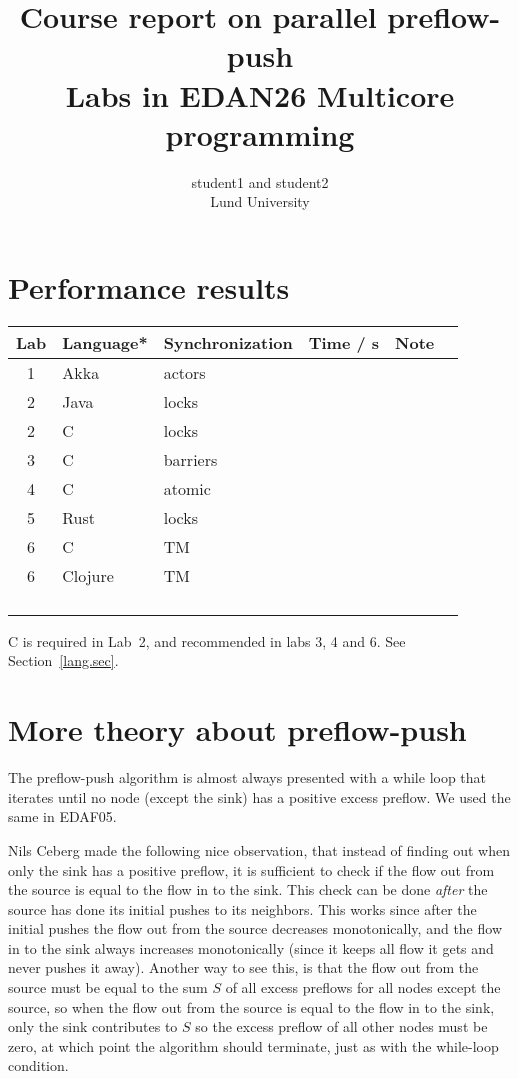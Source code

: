 \documentclass{forsete}
\author{student1 and student2\\Lund University}
\title{Course report on parallel preflow-push\\{\normalsize Labs in EDAN26 Multicore programming}}
\begin{document}
\maketitle

\section{Performance results}
\begin{center}
\begin{tabular}{|c|l|l|r|l|}
\hline
Lab & Language* & Synchronization & Time / s & Note \hspace{21mm} \ \\
\hline
1 & Akka & actors & & \\
\hline
2 & Java & locks & & \\
\hline
2 & C & locks & & \\
\hline
3 & C & barriers & & \\
\hline
4 & C & atomic & & \\
\hline
5 & Rust & locks & & \\
\hline
6 & C & TM & & \\
\hline
6 & Clojure & TM & & \\
\hline
  & & & & \\
\hline
  & & & & \\
\hline
  & & & & \\
\hline
  & & & & \\
\hline
\end{tabular}
\end{center}
\noindent * C is required in Lab~2, and recommended in labs 3, 4 and 6. See Section~\ref{lang.sec}. 

\section{More theory about preflow-push}
The preflow-push algorithm is almost always presented with a while loop that iterates until no node (except the sink) has a positive excess preflow. We used the same in EDAF05.

Nils Ceberg made the following nice observation, that instead of finding out when only the sink has a 
positive preflow, it is sufficient to check 
if the  flow out from the source is equal to the flow in to the sink. This check can be done
{\em after} the source has done its initial pushes to its neighbors. This works
since after the initial pushes the flow out from the source decreases monotonically, and the flow in
to the sink always increases monotonically (since it keeps all flow it gets and never pushes it away).
Another way to see this, is that the flow out from the source must be 
equal to the sum $S$ of all excess preflows for all nodes except the source, so when the flow out from the source
is equal to the flow in to the sink, only the sink contributes to $S$ so the excess preflow of all other nodes
must be zero, at which point the algorithm should terminate, just as with the while-loop condition.
\end{document}
